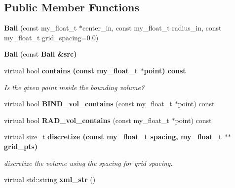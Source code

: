 \subsection*{Public Member Functions}
\begin{CompactItemize}
\item 
\textbf{Ball} (const my\_\-float\_\-t $\ast$center\_\-in, const my\_\-float\_\-t radius\_\-in, const my\_\-float\_\-t grid\_\-spacing=0.0)\label{classASCbase_1_1Ball_97e67bc08a56c79e9e959a632009ade6}

\item 
\textbf{Ball} (const \bf{Ball} \&src)\label{classASCbase_1_1Ball_75d5e1bf95a7262c6bc624dd12dfcc64}

\item 
virtual bool \bf{contains} (const my\_\-float\_\-t $\ast$point) const \label{classASCbase_1_1Ball_2f35f02b622dd5ab6a0587fea4decab9}

\begin{CompactList}\small\item\em Is the given point inside the bounding volume? \item\end{CompactList}\item 
virtual bool \textbf{BIND\_\-vol\_\-contains} (const my\_\-float\_\-t $\ast$point) const \label{classASCbase_1_1Ball_813573b67261525d0e929c403ada4edd}

\item 
virtual bool \textbf{RAD\_\-vol\_\-contains} (const my\_\-float\_\-t $\ast$point) const \label{classASCbase_1_1Ball_35f5cc5ed18329e95f9b76ec9e57341d}

\item 
virtual size\_\-t \bf{discretize} (const my\_\-float\_\-t spacing, my\_\-float\_\-t $\ast$$\ast$grid\_\-pts)\label{classASCbase_1_1Ball_a9f72b0b6f081f0d84907ae3dce7381b}

\begin{CompactList}\small\item\em discretize the volume using the spacing for grid spacing. \item\end{CompactList}\item 
virtual std::string \textbf{xml\_\-str} ()\label{classASCbase_1_1Ball_25e523c23461317176d63b322d700deb}

\end{CompactItemize}
